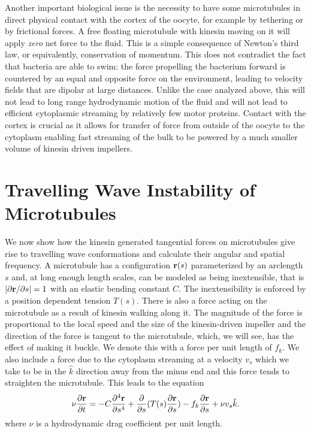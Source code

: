 \documentclass[11pt]{ucthesis}
\def\br{{\bf r}}
\begin{document}
Another important biological issue is the necessity to have some microtubules in direct physical contact
with the cortex of the
oocyte, for example by tethering or by frictional forces. A free floating microtubule with kinesin moving on it will apply {\em zero} net force
to the fluid. This is a simple consequence of Newton's third law, or equivalently, conservation
of momentum. This does not contradict
the fact that bacteria are able to swim: the force propelling the bacterium forward is
countered by an equal and opposite force on the environment, leading to velocity fields that
are dipolar at large distances. Unlike the case analyzed above, this will not lead to long range hydrodynamic motion
of the fluid and will not lead to efficient cytoplasmic streaming by relatively few motor proteins. 
Contact with the cortex is crucial as it allows for transfer of force from outside of
the oocyte to the cytoplasm enabling fast streaming of the bulk to be powered by a much smaller volume of kinesin driven
impellers.

\section{Travelling Wave Instability of Microtubules}

We now show how the kinesin generated tangential forces on microtubules give rise to travelling wave conformations 
and calculate their angular and spatial frequency.
A microtubule has a configuration $\br(s)$ parameterized by 
an arclength $s$ and, at long enough length scales, can be modeled as being inextensible, 
that is $|\partial \br/\partial s| = 1$
with an elastic bending constant $C$. The inextensibility is enforced by a position dependent tension $T(s)$. 
There is also a force acting on the microtubule as a result of kinesin walking along it.
The magnitude of the force is proportional to the local speed and the size of the kinesin-driven impeller
and the direction of the force is tangent to the microtubule,
which, we will see, has the effect of making it buckle. We denote this with a force per unit length of $f_k$. 
We also include a force due to the cytoplasm streaming at a velocity $v_s$ which
we take to be in the $\hat k$ direction away from the minus end and this force tends to straighten the microtubule. This leads to the equation
\begin{equation}
\label{eq:microtubule}
\nu \frac{\partial \br}{\partial t} =  -C \frac{\partial^4 \br}{\partial s^4} + \frac{\partial}{\partial s}(T(s)\frac{\partial \br}{\partial s}) -
f_k \frac{\partial \br}{\partial s} + \nu v_{s}{\hat k} .
\end{equation}
where $\nu$ is a hydrodynamic drag coefficient per unit length. 
\end{document}
